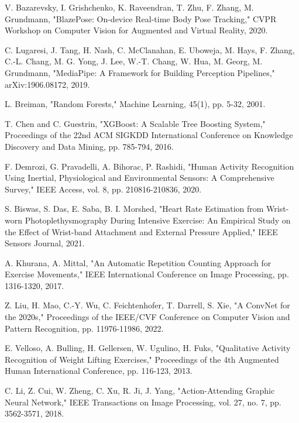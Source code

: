 \documentclass[conference]{IEEEtran}
\begin{document}
\begin{thebibliography}{99}
 V. Bazarevsky, I. Grishchenko, K. Raveendran, T. Zhu, F. Zhang, M. Grundmann, "BlazePose: On-device Real-time Body Pose Tracking," CVPR Workshop on Computer Vision for Augmented and Virtual Reality, 2020.

 C. Lugaresi, J. Tang, H. Nash, C. McClanahan, E. Uboweja, M. Hays, F. Zhang, C.-L. Chang, M. G. Yong, J. Lee, W.-T. Chang, W. Hua, M. Georg, M. Grundmann, "MediaPipe: A Framework for Building Perception Pipelines," arXiv:1906.08172, 2019.

 L. Breiman, "Random Forests," Machine Learning, 45(1), pp. 5-32, 2001.

 T. Chen and C. Guestrin, "XGBoost: A Scalable Tree Boosting System," Proceedings of the 22nd ACM SIGKDD International Conference on Knowledge Discovery and Data Mining, pp. 785-794, 2016.

 F. Demrozi, G. Pravadelli, A. Bihorac, P. Rashidi, "Human Activity Recognition Using Inertial, Physiological and Environmental Sensors: A Comprehensive Survey," IEEE Access, vol. 8, pp. 210816-210836, 2020.

 S. Biswas, S. Das, E. Saba, B. I. Morshed, "Heart Rate Estimation from Wrist-worn Photoplethysmography During Intensive Exercise: An Empirical Study on the Effect of Wrist-band Attachment and External Pressure Applied," IEEE Sensors Journal, 2021.

 A. Khurana, A. Mittal, "An Automatic Repetition Counting Approach for Exercise Movements," IEEE International Conference on Image Processing, pp. 1316-1320, 2017.

 Z. Liu, H. Mao, C.-Y. Wu, C. Feichtenhofer, T. Darrell, S. Xie, "A ConvNet for the 2020s," Proceedings of the IEEE/CVF Conference on Computer Vision and Pattern Recognition, pp. 11976-11986, 2022.

 E. Velloso, A. Bulling, H. Gellersen, W. Ugulino, H. Fuks, "Qualitative Activity Recognition of Weight Lifting Exercises," Proceedings of the 4th Augmented Human International Conference, pp. 116-123, 2013.

 C. Li, Z. Cui, W. Zheng, C. Xu, R. Ji, J. Yang, "Action-Attending Graphic Neural Network," IEEE Transactions on Image Processing, vol. 27, no. 7, pp. 3562-3571, 2018.
\end{thebibliography}
\end{document}
